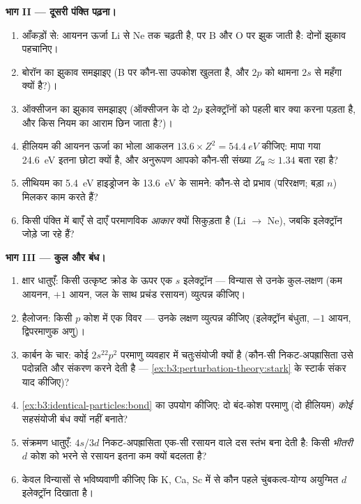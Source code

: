 \begin{problem}[{सप्ताहांत समस्या --- तीन क्वांटम नियम पूरा रसायन
गढ़ते हैं}]
\medskip\noindent\textbf{भाग II --- दूसरी पंक्ति पढ़ना।}
\begin{enumerate}[resume]
  \item आँकड़ों से: आयनन ऊर्जा Li से Ne तक चढ़ती है, पर B और O पर
        झुक जाती है: दोनों झुकाव पहचानिए।
  \item बोरॉन का झुकाव समझाइए (B पर कौन-सा उपकोश खुलता है, और
        $2p$ को थामना $2s$ से महँगा क्यों है?)।
  \item ऑक्सीजन का झुकाव समझाइए (ऑक्सीजन के दो $2p$ इलेक्ट्रॉनों को
        पहली बार क्या करना पड़ता है, और किस नियम का आराम छिन जाता
        है?)।
  \item हीलियम की आयनन ऊर्जा का भोला आकलन
        $13.6 \times Z^2 = \qty{54.4}{eV}$ कीजिए: मापा गया
        \qty{24.6}{eV} इतना छोटा क्यों है, और अनुरूपण आपको कौन-सी
        संख्या $Z_{\text{प्र}} \approx 1.34$ बता रहा है?
  \item लीथियम का \qty{5.4}{eV} हाइड्रोजन के \qty{13.6}{eV} के सामने:
        कौन-से दो प्रभाव (परिरक्षण; बड़ा $n$) मिलकर काम करते हैं?
  \item किसी पंक्ति में बाएँ से दाएँ परमाणविक \emph{आकार} क्यों
        सिकुड़ता है (Li $\to$ Ne), जबकि इलेक्ट्रॉन जोड़े जा रहे हैं?
\end{enumerate}

\medskip\noindent\textbf{भाग III --- कुल और बंध।}
\begin{enumerate}[resume]
  \item क्षार धातुएँ: किसी उत्कृष्ट क्रोड के ऊपर एक $s$ इलेक्ट्रॉन ---
        विन्यास से उनके कुल-लक्षण (कम आयनन, $+1$ आयन, जल के साथ
        प्रचंड रसायन) व्युत्पन्न कीजिए।
  \item हैलोजन: किसी $p$ कोश में एक विवर --- उनके लक्षण व्युत्पन्न
        कीजिए (इलेक्ट्रॉन बंधुता, $-1$ आयन, द्विपरमाणुक अणु)।
  \item कार्बन के चार: कोई $2s^22p^2$ परमाणु व्यवहार में चतुःसंयोजी
        क्यों है (कौन-सी निकट-अपह्रासिता उसे पदोन्नति और संकरण करने
        देती है --- \cref{ex:b3:perturbation-theory:stark} के स्टार्क
        संकर याद कीजिए)?
  \item \cref{ex:b3:identical-particles:bond} का उपयोग कीजिए: दो
        बंद-कोश परमाणु (दो हीलियम) \emph{कोई} सहसंयोजी बंध क्यों
        नहीं बनाते?
  \item संक्रमण धातुएँ: $4s$/$3d$ निकट-अपह्रासिता एक-सी रसायन वाले
        दस स्तंभ बना देती है: किसी \emph{भीतरी} $d$ कोश को भरने से
        रसायन इतना कम क्यों बदलता है?
  \item केवल विन्यासों से भविष्यवाणी कीजिए कि K, Ca, Sc में से कौन
        पहले चुंबकत्व-योग्य अयुग्मित $d$ इलेक्ट्रॉन दिखाता है।
\end{enumerate}


\end{problem}
